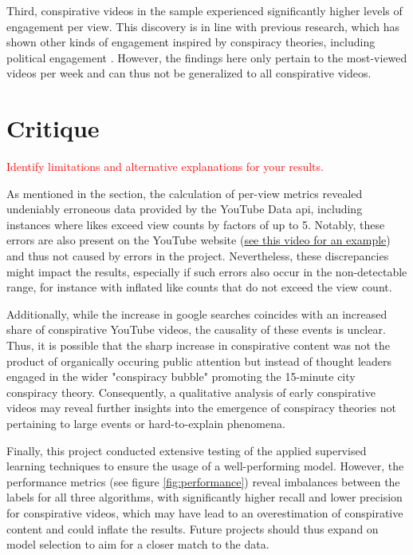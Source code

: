 \documentclass[fontsize=11pt, parskip=half]{scrartcl}
\begin{document}
    Third, conspirative videos in the sample experienced significantly higher levels of engagement per view. This discovery is in line with previous research, which has shown other kinds of engagement inspired by conspiracy theories, including political engagement \parencite{kimHowConspiracyTheories2022}. However, the findings here only pertain to the most-viewed videos per week and can thus not be generalized to all conspirative videos. 

\section{Critique}
\label{section:critique}

    \textcolor{red}{Identify limitations and alternative explanations for your results.}

    As mentioned in the  section, the calculation of per-view metrics revealed undeniably erroneous data provided by the YouTube Data api, including instances where likes exceed view counts by factors of up to 5. Notably, these errors are also present on the YouTube website (\href{https://www.youtube.com/watch?v=XVKdKDHH7UE}{see this video for an example}) and thus not caused by errors in the project. Nevertheless, these discrepancies might impact the results, especially if such errors also occur in the non-detectable range, for instance with inflated like counts that do not exceed the view count.

    Additionally, while the increase in google searches coincides with an increased share of conspirative YouTube videos, the causality of these events is unclear. Thus, it is possible that the sharp increase in conspirative content was not the product of organically occuring public attention but instead of thought leaders engaged in the wider "conspiracy bubble" promoting the 15-minute city conspiracy theory. Consequently, a qualitative analysis of early conspirative videos may reveal further insights into the emergence of conspiracy theories not pertaining to large events or hard-to-explain phenomena.

    Finally, this project conducted extensive testing of the applied supervised learning techniques to ensure the usage of a well-performing model. However, the performance metrics (see figure \ref{fig:performance}) reveal imbalances between the labels for all three algorithms, with significantly higher recall and lower precision for conspirative videos, which may have lead to an overestimation of conspirative content and could inflate the results. Future projects should thus expand on model selection to aim for a closer match to the data.    

\newpage

\onecolumn
\begin{minipage}[t]{\textwidth}
    \printbibliography[heading=bibintoc, title={References}]
\end{minipage}
\end{document}
